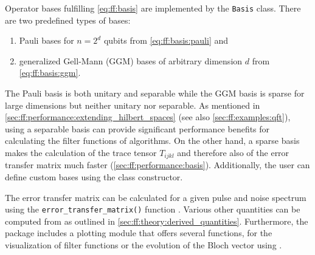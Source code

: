 Operator bases fulfilling \cref{eq:ff:basis} are implemented by the \verb|Basis| class.
There are two predefined types of bases:
\begin{enumerate}
    \item Pauli bases for $n = 2^d$ qubits from \cref{eq:ff:basis:pauli} and
    \item generalized Gell-Mann (GGM) bases of arbitrary dimension $d$ from \cref{eq:ff:basis:ggm}.
\end{enumerate}
The Pauli basis is both unitary and separable while the GGM basis is sparse for large dimensions but neither unitary nor separable.
As mentioned in \cref{sec:ff:performance:extending_hilbert_spaces} (see also \cref{sec:ff:examples:qft}), using a separable basis can provide significant performance benefits for calculating the filter functions of algorithms.
On the other hand, a sparse basis makes the calculation of the trace tensor $T_{ijkl}$ and therefore also of the error transfer matrix \liouvUe much faster (\cf \cref{sec:ff:performance:basis}).
Additionally, the user can define custom bases using the class constructor.

The error transfer matrix \liouvUe can be calculated for a given pulse and noise spectrum using the \verb|error_transfer_matrix()| function .
Various other quantities can be computed from \liouvUe as outlined in \cref{sec:ff:theory:derived_quantities}.
Furthermore, the package includes a plotting module that offers several functions, \eg for the visualization of filter functions or the evolution of the Bloch vector using \qutip.


